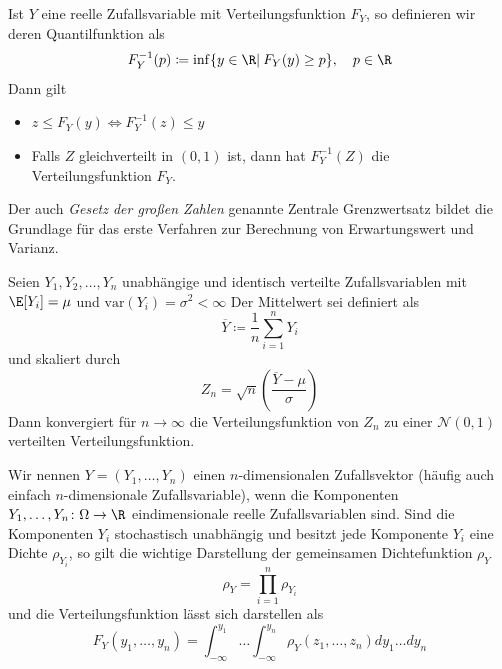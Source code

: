 \begin{maththeorem}[Inversionsmethode]
\label{thinversionsmethode}
Ist $Y$ eine reelle Zufallsvariable mit Verteilungsfunktion $F_Y$, so definieren wir deren Quantilfunktion als
\[F_Y^{-1}(p)\coloneqq \inf\lbrace y\in\R |\: F_Y(y)\ge p\rbrace,\quad p\in\R\]
Dann gilt
\begin{itemize}
\item $z\le F_Y(y)\iff F_Y^{-1}(z)\le y$\\
\item Falls $Z$ gleichverteilt in $(0,1)$ ist, dann hat $F_Y^{-1}(Z)$ die Verteilungsfunktion $F_Y$. 
\end{itemize}
\end{maththeorem}
Der auch \emph{Gesetz der großen Zahlen} genannte Zentrale Grenzwertsatz bildet die Grundlage für das erste Verfahren zur Berechnung von Erwartungswert und Varianz.
\begin{maththeorem}
\label{thzentralgrenzwert}
Seien $Y_1,Y_2,\dots,Y_n$ unabhängige und identisch verteilte Zufallsvariablen mit $\E[Y_i]=\mu$ und $\text{var}(Y_i)=\sigma^2<\infty$ Der Mittelwert sei definiert als
\[\overline{Y}\coloneqq \frac{1}{n}\sum_{i=1}^nY_i\]
und skaliert durch
\[Z_n=\sqrt{n}\left(\frac{\overline{Y}-\mu}{\sigma}\right)\]
Dann konvergiert für $n\to\infty$ die Verteilungsfunktion von $Z_n$ zu einer $\mathcal{N}(0,1)$ verteilten Verteilungsfunktion.
\end{maththeorem}
\begin{mathdef}[Zufallsvektoren]
Wir nennen $Y=(Y_1,\dots,Y_n)$ einen $n$-dimensionalen Zufallsvektor (häufig auch einfach $n$-dimensionale Zufallsvariable), wenn die Komponenten $Y_1,\dots,Y_n\colon\Omega\to\R$ eindimensionale reelle Zufallsvariablen sind. Sind die Komponenten $Y_i$ stochastisch unabhängig und besitzt jede Komponente $Y_i$ eine Dichte $\rho_{Y_i}$, so gilt die wichtige Darstellung der gemeinsamen Dichtefunktion $\rho_Y$
\[\rho_Y=\prod_{i=1}^n \rho_{Y_i}\]
und die Verteilungsfunktion lässt sich darstellen als
\[F_Y(y_1,\dots,y_n)=\int_{-\infty}^{y_1}\dots\int_{-\infty}^{y_n}\rho_Y(z_1,\dots,z_n)dy_1\dots dy_n\]
\end{mathdef}

